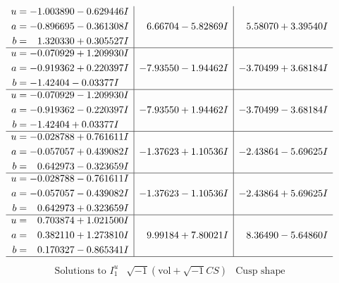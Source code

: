 \documentclass[1p]{elsarticle_modified}
\theoremstyle{definition}
\newcommand{\I}{\sqrt{-1}}
\begin{document}
$$\begin{array}{c|c|c}
\begin{aligned}
u &= -1.003890 - 0.629446 I \\
a &= -0.896695 - 0.361308 I \\
b &= \phantom{-}1.320330 + 0.305527 I\end{aligned}
 & \phantom{-}6.66704 - 5.82869 I & \phantom{-}5.58070 + 3.39540 I \\ \hline\begin{aligned}
u &= -0.070929 + 1.209930 I \\
a &= -0.919362 + 0.220397 I \\
b &= -1.42404 - 0.03377 I\end{aligned}
 & -7.93550 - 1.94462 I & -3.70499 + 3.68184 I \\ \hline\begin{aligned}
u &= -0.070929 - 1.209930 I \\
a &= -0.919362 - 0.220397 I \\
b &= -1.42404 + 0.03377 I\end{aligned}
 & -7.93550 + 1.94462 I & -3.70499 - 3.68184 I \\ \hline\begin{aligned}
u &= -0.028788 + 0.761611 I \\
a &= -0.057057 + 0.439082 I \\
b &= \phantom{-}0.642973 - 0.323659 I\end{aligned}
 & -1.37623 + 1.10536 I & -2.43864 - 5.69625 I \\ \hline\begin{aligned}
u &= -0.028788 - 0.761611 I \\
a &= -0.057057 - 0.439082 I \\
b &= \phantom{-}0.642973 + 0.323659 I\end{aligned}
 & -1.37623 - 1.10536 I & -2.43864 + 5.69625 I \\ \hline\begin{aligned}
u &= \phantom{-}0.703874 + 1.021500 I \\
a &= \phantom{-}0.382110 + 1.273810 I \\
b &= \phantom{-}0.170327 - 0.865341 I\end{aligned}
 & \phantom{-}9.99184 + 7.80021 I & \phantom{-}8.36490 - 5.64860 I\\
 \hline 
 \end{array}$$\newpage$$\begin{array}{c|c|c}  
\text{Solutions to }I^u_{1}& \I (\text{vol} + \sqrt{-1}CS) & \text{Cusp shape}\\
 \hline 
\begin{aligned}

\end{aligned}
\end{array}$$
\end{document}
